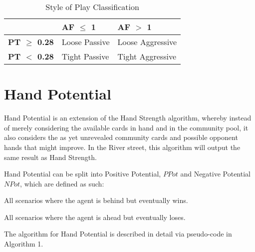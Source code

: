 \documentclass{article}
\begin{document}
\begin{table}[h!]
  \begin{center}
    \begin{tabular}{p{1.5cm}|p{2cm}|p{2cm}}
      \textbf{} & \textbf{AF $\leq$ 1} & \textbf{AF $>$ 1} \\
      \hline
      \textbf{PT $\geq$ 0.28} & Loose \newline Passive & Loose \newline Aggressive \\
      \hline
      \textbf{PT $<$ 0.28} & Tight \newline Passive & Tight \newline Aggressive \\
    \end{tabular}
    \caption{Style of Play Classification}
    \label{tab:table4}
  \end{center}
\end{table}

\iffalse
\section{Hand Potential}

Hand Potential is an extension of the Hand Strength algorithm, whereby instead of merely considering the available cards in hand and in the community pool, it also considers the as yet unrevealed community cards and possible opponent hands that might improve. In the River street, this algorithm will output the same result as Hand Strength.

Hand Potential can be split into Positive Potential, $PPot$ and Negative Potential $NPot$, which are defined as such:
\begin{description}[style=multiline,leftmargin=10mm]
\item [\emph{PPot}]All scenarios where the agent is behind but eventually wins.
\item [\emph{NPot}]All scenarios where the agent is ahead but eventually loses.
\end{description}

The algorithm for Hand Potential is described in detail via pseudo-code in Algorithm 1.
\end{document}
